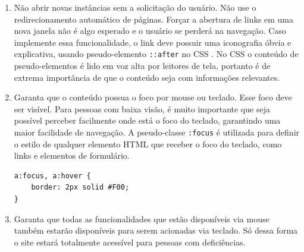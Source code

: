 {{{\begin{enumerate}
{\begin{lstlisting}[language=html,caption=separando links adjacentes]
<ul id="menu">
    <li> <a href="home.html">Home</a></li>
    <li> <a href="pesquisa.html">Pesquisa</a></li>
</ul>
\end{lstlisting}}
    \item Não abrir novas instâncias sem a solicitação do usuário. Não use o redirecionamento automático de páginas. Forçar a abertura de links em uma nova janela não é algo esperado e o usuário se perderá na navegação. Caso implemente essa funcionalidade, o link deve possuir uma iconografia óbvia e explicativa, usando pseudo-elemento \lstinline{::after} no CSS \cite{CSS}. No CSS o conteúdo de pseudo-elementos é lido em voz alta por leitores de tela, portanto é de extrema importância de que o conteúdo seja com informações relevantes.
    \item Garanta que o conteúdo possua o foco por mouse ou teclado. Esse foco deve ser visível. Para pessoas com baixa visão, é muito importante que seja possível perceber facilmente onde está o foco do teclado, garantindo uma maior facilidade de navegação. A pseudo-classe \lstinline{:focus} é utilizada para definir o estilo de qualquer elemento HTML \cite{HTML} que receber o foco do teclado, como links e elementos de formulário.
{\begin{lstlisting}[language=html,caption=usando o foco visível]
a:focus, a:hover {
    border: 2px solid #F00;
}
\end{lstlisting}}
    \item Garanta que todas as funcionalidades que estão disponíveis via mouse também estarão disponíveis para serem acionadas via teclado. Só dessa forma o site estará totalmente acessível para pessoas com deficiências. 
\end{enumerate}
}
}
}

